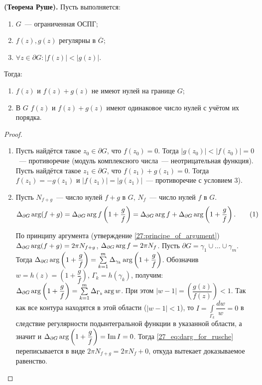 \begin{statement} \label{27:th_rusche}
\textbf{(Теорема Руше).} Пусть выполняется:
\begin{enumerate}[wide=20pt, itemsep=0ex]
\item \(G\)~--- ограниченная ОСПГ;
\item \(f(z), g(z)\) регулярны в \(\overline{G}\);
\item \(\forall z \in \partial G \colon |f(z)| < |g(z)|\).
\end{enumerate}
Тогда:
\begin{enumerate}[wide=20pt, itemsep=0ex]
\item \(f(z)\) и \(f(z) + g(z)\) не имеют нулей на границе \(G\); 
\item В \(G\) \(f(z)\) и \(f(z) + g(z)\) имеют одинаковое число нулей с учётом их порядка.
\end{enumerate}
\end{statement}

\begin{proof}
\begin{enumerate}[wide=20pt, itemsep=0ex]
\item Пусть найдётся такое \(z_0 \in \partial G\), что \(f(z_0) = 0\). Тогда \(|g(z_0)| < |f(z_0)| =
    0\)~--- противоречие (модуль комплексного числа~--- неотрицательная функция). Пусть найдётся
    такое \(z_1 \in \partial G\), что \(f(z_1) + g(z_1) = 0\). Тогда \(f(z_1) = -g(z_1)\) и 
    \(|f(z_1)| = |g(z_1)|\)~--- противоречие с условием 3).
\item Пусть \(N_{f+g}\)~--- число нулей \(f+g\) в \(G\), \(N_f\)~--- число нулей \(f\) в \(G\).
    \begin{equation} \label{27_eq:darg_for_rusche}
    \Delta_{\partial G} \operatorname{arg} (f+g) = \Delta_{\partial G} \operatorname{arg} f\left(1 + \dfrac{g}{f}\right) = 
    \Delta_{\partial G} \operatorname{arg} f + \Delta_{\partial G} \operatorname{arg} \left(1 + \dfrac{g}{f}\right). \tag{1}
    \end{equation}

    По принципу аргумента (утверждение 
    \ref{27:principe_of_argument}) \(\Delta_{\partial G} \operatorname{arg} (f+g) = 2\pi N_{f+g}\), \(\Delta_{\partial G} \operatorname{arg} f
    = 2 \pi N_f\). Пусть \(\partial G = \gamma_1 \cup \dots \cup \gamma_m\). Тогда \(\Delta_{\partial
    G} \operatorname{arg} \left(1 + \dfrac{g}{f}\right) = \sum\limits_{k = 1}^m \Delta_{\gamma_k} \operatorname{arg} \left(1 + \dfrac{g}{f}
    \right)\). Обозначив \(w = h(z) = \left(1 + \dfrac{g}{f}\right)\), \(\Gamma_k = h(\gamma_k)\),
    получим: \(\Delta_{\partial G} \operatorname{arg} \left(1 + \dfrac{g}{f}\right) = \sum\limits_{k = 1}^m 
    \Delta_{\Gamma_k} \operatorname{arg} w\). При этом \(|w - 1| = \left(\dfrac{g(z)}{f(z)}\right) < 1\). Так как все
    контура находятся в этой области (\(|w - 1| < 1\)), то \(I = \int\limits_{\Gamma_k}
    \dfrac{dw}{w} = 0\) в следствие регулярности подынтегральной функции в указанной области, а
    значит и \(\Delta_{\partial G} \operatorname{arg} \left(1 + \dfrac{g}{f}\right) = \operatorname{Im} I = 0\). Тогда
    \eqref{27_eq:darg_for_rusche} переписывается в виде \(2 \pi N_{f+g} = 2\pi N_f + 0\), откуда
    вытекает доказываемое равенство.
\end{enumerate}
\end{proof}

